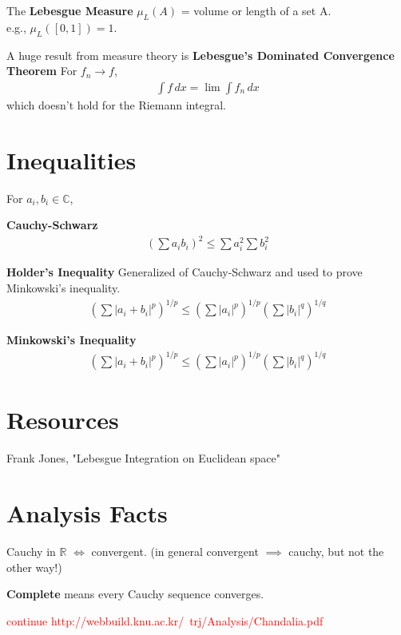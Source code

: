 \documentclass[a4paper, 12pt]{article}
\def\R{\ensuremath{\mathbb{R}}} %
\def\C{\ensuremath{\mathbb{C}}}
\newcommand{\bt}[1]{\textbf{#1}} %
\newcommand{\eq}[1]{\begin{align*}#1\end{align*}} %
\renewcommand{\eq}[1]{\begin{align*}#1\end{align*}} %
\begin{document}
The \bt{Lebesgue Measure} $\mu_L(A)$ = volume or length of a set A. \\
e.g., $\mu_L([0,1]) =1$.


A huge result from measure theory is \bt{Lebesgue's Dominated Convergence Theorem}
For $f_n \rightarrow f$, 
\eq{
\int f\,dx = \lim \int f_n\,dx
}
which doesn't hold for the Riemann integral.

\section{Inequalities}
For $a_i, b_i \in \C$, 

\bt{Cauchy-Schwarz}
\eq{
(\sum a_ib_i)^2 \leq \sum a_i^2 \sum b_i^2
}

\bt{Holder's Inequality}
Generalized of Cauchy-Schwarz and used to prove Minkowski's inequality.
\eq{
(\sum |a_i + b_i|^p)^{1/p} \leq (\sum |a_i|^p)^{1/p} (\sum |b_i|^q)^{1/q}
\tag{for $1/q + 1/p = 1$ and $1\leq p$.}
}

\bt{Minkowski's Inequality}
\eq{
(\sum |a_i + b_i|^p)^{1/p} \leq (\sum |a_i|^p)^{1/p} (\sum |b_i|^q)^{1/q}
}

\section*{Resources}
Frank Jones, "Lebesgue Integration on Euclidean space"


\section*{Analysis Facts}

Cauchy in $\R$ $\iff$ convergent. 
(in general convergent $\implies$ cauchy, but not the other way!)

\bt{Complete} means every Cauchy sequence converges.


\textcolor{red}{continue http://webbuild.knu.ac.kr/~trj/Analysis/Chandalia.pdf}
\end{document}
